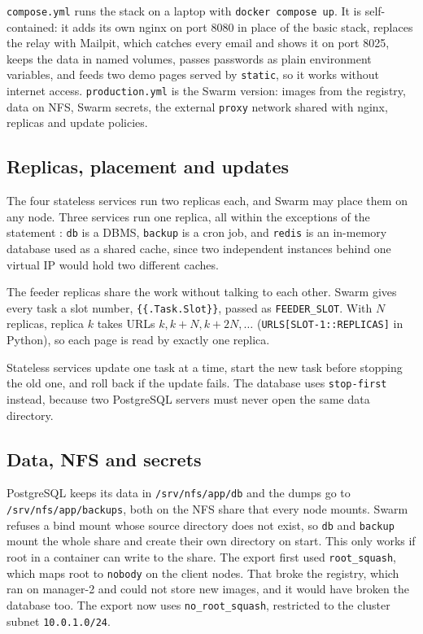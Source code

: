 \texttt{compose.yml} runs the stack on a laptop with
\texttt{docker compose up}. It is self-contained: it adds its own nginx
on port 8080 in place of the basic stack, replaces the relay with
Mailpit, which catches every email and shows it on port 8025, keeps the
data in named volumes, passes passwords as plain environment variables,
and feeds two demo pages served by \texttt{static}, so it works without
internet access. \texttt{production.yml} is the Swarm version: images
from the registry, data on NFS, Swarm secrets, the external
\texttt{proxy} network shared with nginx, replicas and update policies.

\subsection{Replicas, placement and updates}

The four stateless services run two replicas each, and Swarm may place
them on any node. Three services run one replica, all within the
exceptions of the statement \parencite{llusa2026project}:
\texttt{db} is a DBMS, \texttt{backup} is a cron job, and \texttt{redis}
is an in-memory database used as a shared cache, since two independent
instances behind one virtual IP would hold two different caches.

The feeder replicas share the work without talking to each other. Swarm
gives every task a slot number, \texttt{\{\{.Task.Slot\}\}}, passed as
\texttt{FEEDER\_SLOT}. With $N$ replicas, replica $k$ takes URLs
$k, k+N, k+2N, \ldots$ (\texttt{URLS[SLOT-1::REPLICAS]} in Python), so
each page is read by exactly one replica.

Stateless services update one task at a time, start the new task before
stopping the old one, and roll back if the update fails. The database
uses \texttt{stop-first} instead, because two PostgreSQL servers must
never open the same data directory.

\subsection{Data, NFS and secrets}
\label{sec:app-nfs}

PostgreSQL keeps its data in \texttt{/srv/nfs/app/db} and the dumps go
to \texttt{/srv/nfs/app/backups}, both on the NFS share that every node
mounts. Swarm refuses a bind mount whose source directory does not
exist, so \texttt{db} and \texttt{backup} mount the whole share and
create their own directory on start. This only works if root in a
container can write to the share. The export first used
\texttt{root\_squash}, which maps root to \texttt{nobody} on the client
nodes. That broke the registry, which ran on manager-2 and could not
store new images, and it would have broken the database too. The export
now uses \texttt{no\_root\_squash}, restricted to the cluster subnet
\texttt{10.0.1.0/24}.

